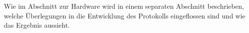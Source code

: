 Wie im Abschnitt  zur Hardware wird in einem  separaten Abschnitt beschrieben,
welche \"Uberlegungen in die Entwicklung  des Protokolls eingeflossen sind und
wie das Ergebnis aussieht.


{\begin{a3pages}
    \lipsum
    \lipsum
    \lipsum
    \lipsum
    \lipsum
\end{a3pages}}
%
\lipsum
